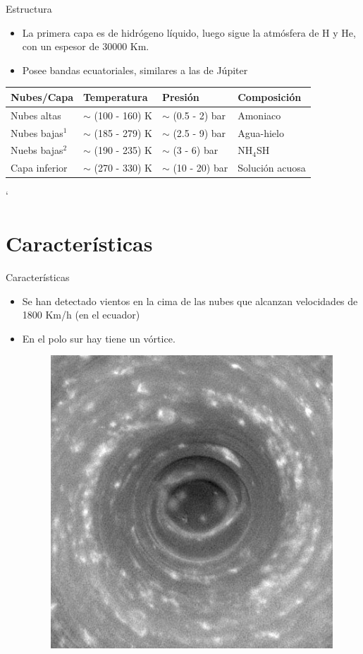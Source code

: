 \documentclass{beamer}
\begin{document}
\begin{frame}{Estructura}
    \begin{itemize}
        \item La primera capa es de hidrógeno líquido, luego sigue la atmósfera de H y He, con un espesor de 30000 Km.
        \item Posee bandas ecuatoriales, similares a las de Júpiter
            \vspace{\baselineskip}
    \end{itemize}
    \centering
    \begin{tabular}{|l|l|l|l}
        Nubes/Capa & Temperatura & Presión & Composición\\ \hline
        Nubes altas & $\sim$ (100 - 160) K & $\sim$ (0.5 - 2) bar & Amoniaco\\
        Nubes bajas$^1$ & $\sim$ (185 - 279) K & $\sim$ (2.5 - 9) bar & Agua-hielo \\ 
        Nuebs bajas$^2$ & $\sim$ (190 - 235) K & $\sim$ (3 - 6) bar &  NH$_4$SH \\
        Capa inferior & $\sim$ (270 - 330) K & $\sim$ (10 - 20) bar & Solución acuosa
    \end{tabular}`
\end{frame}

\section{Características}
\begin{frame}{Características}


    \begin{itemize}
        \item Se han detectado vientos en la cima de las nubes que alcanzan velocidades de 1800 Km/h (en el ecuador)
        \item En el polo sur hay tiene un vórtice.

            \vspace{1cm}
    \begin{figure}
        \centering
        \includegraphics[width=0.3\linewidth]{polar_vortex}
    \end{figure}

    \end{itemize}

\end{frame}
\end{document}

